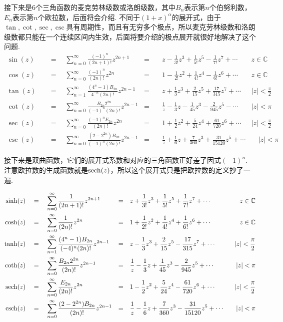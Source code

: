 \documentclass[UTF8]{ctexart}
\begin{document}
接下来是6个三角函数的麦克劳林级数或洛朗级数，其中\(B_n\)表示第\(n\)个伯努利数，\(E_n\)表示第\(n\)个欧拉数，后面将会介绍. 不同于\((1+x)^{\alpha}\)的展开式，由于\(\tan,\cot,\sec,\csc\)具有周期性，而且有无穷多个极点，所以麦克劳林级数和洛朗级数都只能在一个连续区间内生效，后面将要介绍的极点展开就很好地解决了这个问题.
\begin{align*}
    \sin(z)\quad&=\quad \sum_{n=0}^{\infty}\frac{(-1)^n}{(2n+1)!}z^{2n+1} &=&\quad z-\frac{1}{3!}z^3+\frac{1}{5!}z^5-\frac{1}{7!}z^7+\cdots & z \in \mathbb{C} \\
    \cos(z) \quad&=\quad \sum_{n=0}^{\infty}\frac{(-1)^n}{(2n)!}z^{2n} &=&\quad 1-\frac{1}{2!}z^2+\frac{1}{4!}z^4-\frac{1}{6!}z^6+\cdots & z \in \mathbb{C} \\
    \tan(z) \quad&=\quad \sum_{n=1}^{\infty}\frac{(4^{n}-1)B_{2n}}{4^{-n}(2n)!}z^{2n-1} &=&\quad z + \frac{1}{3}z^3 + \frac{2}{15}z^5 + \frac{17}{315}z^7+\cdots & |z|<\frac {\pi}{2} \\
    \cot(z) \quad&=\quad \sum_{n=0}^{\infty}\frac{B_{2n}2^{2n}}{(-1)^n(2n)!}z^{2n-1} &=&\quad \frac{1}{z}-\frac{1}{3}z-\frac{1}{45}z^3-\frac{2}{945}z^5-\cdots & |z|<{\pi} \\
    \sec(z) \quad&=\quad \sum_{n=0}^{\infty}\frac{(-1)^nE_{2n}}{(2n)!}z^{2n} &=&\quad 1+\frac{1}{2}z^2+\frac{5}{24}z^4+\frac{61}{720}z^6+\cdots & |z|<\frac{\pi}{2} \\
    \csc(z) \quad&=\quad \sum_{n=0}^{\infty}\frac{(2-2^{2n})B_{2n}}{(-1)^{n}(2n)!}z^{2n-1} &=&\quad \frac{1}{z} + \frac{1}{6}z + \frac{7}{360}z^3 + \frac{31}{15120}z^5 +\cdots & \quad |z|<\pi
\end{align*}

接下来是双曲函数，它们的展开式系数和对应的三角函数正好差了因式\((-1)^n\). 注意欧拉数的生成函数就是\({\rm sech}(z)\)，所以这个展开式只是把欧拉数的定义抄了一遍.

\begin{align*}
    \sinh(z) \quad&=\quad \sum_{n=0}^{\infty}\frac{1}{(2n+1)!}z^{2n+1} &=&\quad z+\frac{1}{3!}z^3+\frac{1}{5!}z^5+\frac{1}{7!}z^7+\cdots & z \in \mathbb{C} \\
    \cosh(z) \quad&=\quad \sum_{n=0}^{\infty}\frac{1}{(2n)!}z^{2n} &=&\quad 1+\frac{1}{2!}z^2+\frac{1}{4!}z^4+\frac{1}{6!}z^6+\cdots & z \in \mathbb{C} \\
    \tanh(z) \quad&=\quad \sum_{n=1}^{\infty}\frac{(4^{n}-1)B_{2n}}{(-4)^n(2n)!}z^{2n-1} &=&\quad z - \frac{1}{3}z^3 + \frac{2}{15}z^5 - \frac{17}{315}z^7+\cdots & |z|<\frac {\pi}{2} \\
    {\rm coth}(z) \quad&=\quad \sum_{n=0}^{\infty}\frac{B_{2n}2^{2n}}{(2n)!}z^{2n-1} &=&\quad \frac{1}{z}-\frac{1}{3}z+\frac{1}{45}z^3-\frac{2}{945}z^5+\cdots & |z|<{\pi} \\
    {\rm sech}(z) \quad&=\quad \sum_{n=0}^{\infty}\frac{E_{2n}}{(2n)!}z^{2n} &=&\quad 1-\frac{1}{2}z^2+\frac{5}{24}z^4-\frac{61}{720}z^6+\cdots & |z|<\frac{\pi}{2} \\
    {\rm csch}(z) \quad&=\quad \sum_{n=0}^{\infty}\frac{(2-2^{2n})B_{2n}}{(2n)!}z^{2n-1} &=&\quad \frac{1}{z} - \frac{1}{6}z + \frac{7}{360}z^3 - \frac{31}{15120}z^5 +\cdots & \quad |z|<\pi
\end{align*}
\end{document}

